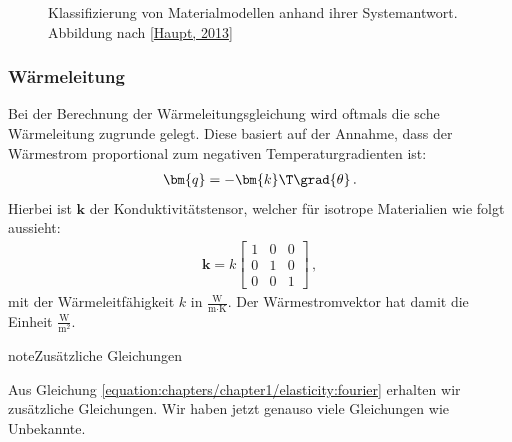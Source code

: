 \documentclass[letterpaper,10pt,german]{jupyterBook}
\let\sphinxpxdimen\pdfpxdimen\else\newdimen\sphinxpxdimen
\begin{document}
\begin{figure}[htbp]
\centering
\capstart

\noindent\sphinxincludegraphics[height=500\sphinxpxdimen]{{Materialklassen}.png}
\caption{Klassifizierung von Materialmodellen anhand ihrer Systemantwort. Abbildung nach {[}\hyperlink{cite.quellen:id7}{Haupt, 2013}{]}}\label{\detokenize{chapters/chapter1/elasticity:materialklassen}}\end{figure}




\subsubsection{Wärmeleitung}
\label{\detokenize{chapters/chapter1/elasticity:warmeleitung}}
\sphinxAtStartPar
Bei der Berechnung der Wärmeleitungsgleichung wird oftmals die sche Wärmeleitung zugrunde gelegt. Diese basiert auf der Annahme, dass der Wärmestrom proportional zum negativen Temperaturgradienten ist:
\begin{equation}\label{equation:chapters/chapter1/elasticity:fourier}
\begin{split}\bm{q} = - \bm{k}\T  \grad{\theta} \, .\end{split}
\end{equation}
\sphinxAtStartPar
Hierbei ist \(\bm{k}\) der Konduktivitätstensor, welcher für isotrope Materialien wie folgt aussieht:
\begin{equation}\label{equation:chapters/chapter1/elasticity:konduktivitaetsmatrixIsotrop}
\begin{split} \bm{k} = k \begin{bmatrix} 1 & 0 & 0 \\ 0 & 1 & 0 \\ 0 & 0 & 1\end{bmatrix}  \, ,\end{split}
\end{equation}
\sphinxAtStartPar
mit der Wärmeleitfähigkeit \(k\) in \(\frac{\text{W}}{\text{m}\cdot\text{K}}\). Der Wärmestromvektor hat damit die Einheit \(\frac{\text{W}}{\text{m}^2}\).

\begin{sphinxadmonition}{note}{Zusätzliche Gleichungen}

\sphinxAtStartPar
Aus Gleichung \eqref{equation:chapters/chapter1/elasticity:fourier} erhalten wir  zusätzliche Gleichungen. Wir haben jetzt genauso viele Gleichungen wie Unbekannte.
\end{sphinxadmonition}
\end{document}
